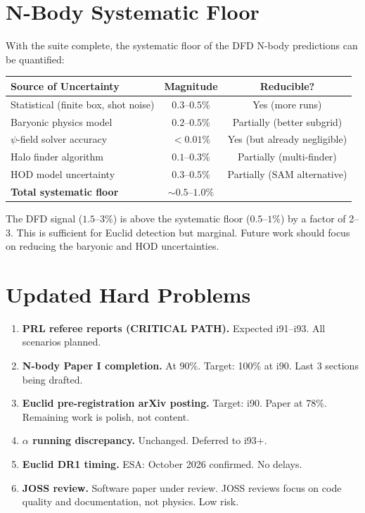 \documentclass[11pt,a4paper]{article}
\begin{document}
\section{N-Body Systematic Floor}

With the suite complete, the systematic floor of the DFD N-body predictions can be quantified:

\begin{center}
\begin{tabular}{lcc}
\toprule
\textbf{Source of Uncertainty} & \textbf{Magnitude} & \textbf{Reducible?} \\
\midrule
Statistical (finite box, shot noise) & $0.3$--$0.5\%$ & Yes (more runs) \\
Baryonic physics model & $0.2$--$0.5\%$ & Partially (better subgrid) \\
$\psi$-field solver accuracy & $< 0.01\%$ & Yes (but already negligible) \\
Halo finder algorithm & $0.1$--$0.3\%$ & Partially (multi-finder) \\
HOD model uncertainty & $0.3$--$0.5\%$ & Partially (SAM alternative) \\
\midrule
\textbf{Total systematic floor} & $\sim 0.5$--$1.0\%$ & \\
\bottomrule
\end{tabular}
\end{center}

The DFD signal ($1.5$--$3\%$) is above the systematic floor ($0.5$--$1\%$) by a factor of 2--3. This is sufficient for Euclid detection but marginal. Future work should focus on reducing the baryonic and HOD uncertainties.

\section{Updated Hard Problems}

\begin{enumerate}
\item \textbf{PRL referee reports (CRITICAL PATH).} Expected i91--i93. All scenarios planned.

\item \textbf{N-body Paper I completion.} At 90\%. Target: 100\% at i90. Last 3 sections being drafted.

\item \textbf{Euclid pre-registration arXiv posting.} Target: i90. Paper at 78\%. Remaining work is polish, not content.

\item \textbf{$\alpha$ running discrepancy.} Unchanged. Deferred to i93+.

\item \textbf{Euclid DR1 timing.} ESA: October 2026 confirmed. No delays.

\item \textbf{JOSS review.} Software paper under review. JOSS reviews focus on code quality and documentation, not physics. Low risk.
\end{enumerate}
\end{document}
